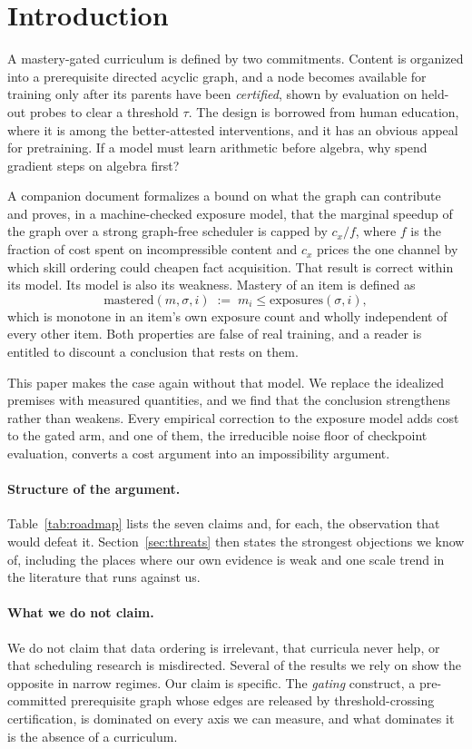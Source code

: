 \documentclass[11pt]{article}
\theoremstyle{plain}
\theoremstyle{definition}
\theoremstyle{remark}
\begin{document}
\section{Introduction}

A mastery-gated curriculum is defined by two commitments. Content is organized
into a prerequisite directed acyclic graph, and a node becomes available for
training only after its parents have been \emph{certified}, shown by evaluation
on held-out probes to clear a threshold $\tau$. The design is borrowed from
human education, where it is among the better-attested interventions, and it has
an obvious appeal for pretraining. If a model must learn arithmetic before
algebra, why spend gradient steps on algebra first?

A companion document formalizes a bound on what the graph can contribute and
proves, in a machine-checked exposure model, that the marginal speedup of the
graph over a strong graph-free scheduler is capped by $c_x/f$, where $f$ is the
fraction of cost spent on incompressible content and $c_x$ prices the one channel
by which skill ordering could cheapen fact acquisition. That result is correct
within its model. Its model is also its weakness. Mastery of an item is defined
as
\[
\mathrm{mastered}(m,\sigma,i) \;:=\; m_i \le \mathrm{exposures}(\sigma, i),
\]
which is monotone in an item's own exposure count and wholly independent of every
other item. Both properties are false of real training, and a reader is entitled
to discount a conclusion that rests on them.

This paper makes the case again without that model. We replace the idealized
premises with measured quantities, and we find that the conclusion strengthens
rather than weakens. Every empirical correction to the exposure model adds cost
to the gated arm, and one of them, the irreducible noise floor of checkpoint
evaluation, converts a cost argument into an impossibility argument.

\paragraph{Structure of the argument.} Table~\ref{tab:roadmap} lists the seven
claims and, for each, the observation that would defeat it.
Section~\ref{sec:threats} then states the strongest objections we know of,
including the places where our own evidence is weak and one scale trend in the
literature that runs against us.

\paragraph{What we do not claim.} We do not claim that data ordering is
irrelevant, that curricula never help, or that scheduling research is
misdirected. Several of the results we rely on show the opposite in narrow
regimes. Our claim is specific. The \emph{gating} construct, a pre-committed
prerequisite graph whose edges are released by threshold-crossing
certification, is dominated on every axis we can measure, and what dominates it
is the absence of a curriculum.
\end{document}
